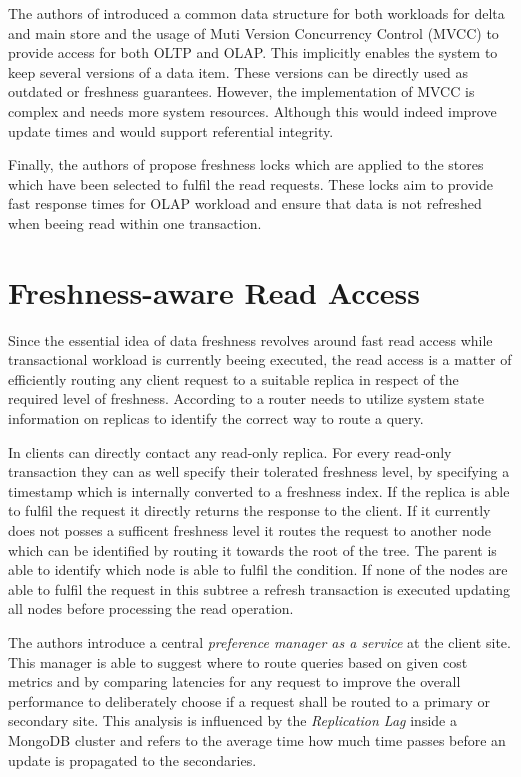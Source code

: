 The authors of \cite{psaroudakis:2015} introduced a common data structure for both workloads for delta and
main store and the usage of Muti Version Concurrency Control (MVCC) to provide access for both OLTP and OLAP.
This implicitly enables the system to keep several versions of a data item.
These versions can be directly used as outdated or freshness guarantees. However, the implementation of MVCC is complex and needs more system resources.
Although this would indeed improve update times and would support referential integrity. 

Finally, the authors of \cite{akal:2005} propose freshness locks which are applied to the stores which have been selected to fulfil the read requests. 
These locks aim to provide fast response times for OLAP workload and ensure that data is not refreshed when beeing read within one transaction.



\section{Freshness-aware Read Access}
\label{r:read}
Since the essential idea of data freshness revolves around fast read access while transactional workload is currently beeing executed,
the read access is a matter of efficiently routing any client request to a suitable replica in respect of the required level of freshness.
According to \cite{rohm:2002} a router needs to utilize system state information on replicas to identify the correct way to route a query.

In \cite{voicu:2010} clients can directly contact any read-only replica. For every read-only transaction they can as well specify
their tolerated freshness level, by specifying a timestamp which is internally converted to a freshness index. If the replica is able to fulfil the request 
it directly returns the response to the client. If it currently does not posses a sufficent freshness level it routes the request to another node which can be identified 
by routing it towards the root of the tree. The parent is able to identify which node is able to fulfil the condition.  
If none of the nodes are able to fulfil the request in this subtree a refresh transaction is executed updating all nodes before processing the read operation.

The authors \cite{huang:2020} introduce a central \emph{preference manager as a service} at the client site. This manager is able to suggest where to route queries 
based on given cost metrics and by comparing latencies for any request to improve the overall performance to deliberately choose if a request shall be routed to a 
primary or secondary site. This analysis is influenced by the \emph{Replication Lag} inside a MongoDB cluster and refers to the average time how much time passes 
before an update is propagated to the secondaries. 




